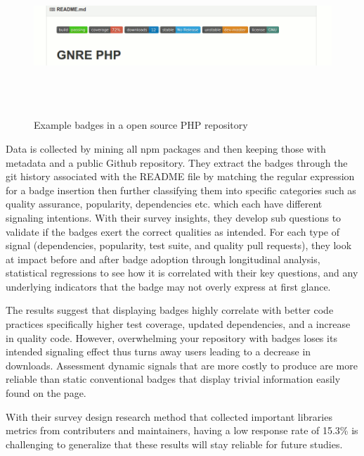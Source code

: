 \documentclass[12pt]{article}
\begin{document}
\begin{figure}
    \centering
    \includegraphics[width=\textwidth,height=6cm,keepaspectratio=true]{gnrephpbadges}
    \caption{
        Example badges in a open source PHP repository \protect\cite{badgeimage}
    }
    \label{phpbadge}
\end{figure}

Data is collected by mining all npm \cite{npm} packages and then keeping those with metadata and a public Github \cite{github} repository. 
They extract the badges through the git history associated with 
the README file by matching the regular expression for a badge insertion then further classifying them into specific categories
such as quality assurance, popularity, dependencies etc. which each have different signaling intentions.
With their survey insights, they develop sub questions to validate if the badges exert the correct qualities as intended. 
For each type of signal (dependencies, popularity, test suite, and quality pull requests), they look at 
impact before and after badge adoption through longitudinal analysis, statistical regressions
to see how it is correlated with their key questions, and any underlying indicators that the badge may not overly express at first glance.

The results suggest that displaying badges highly correlate with better code practices specifically higher test coverage, updated dependencies, and a increase in quality code.
However, overwhelming your repository with badges loses its intended signaling effect thus turns away users leading to a decrease in downloads.
Assessment dynamic signals that are more costly to produce are more reliable than static conventional badges that display trivial information easily found on the page.

With their survey design research method that collected important libraries metrics from contributers and maintainers, having a low response rate of 15.3\% 
is challenging to generalize that these results will stay reliable for future studies.
\end{document}
